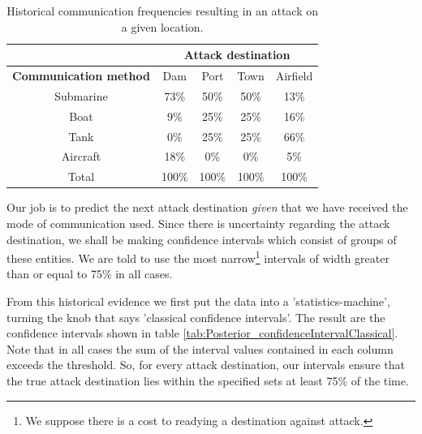 \documentclass[11pt,fullpage]{book}
\begin{document}
\begin{table}[htbp]
  \centering
    \begin{tabular}{ccccc}
    \toprule
          & \multicolumn{4}{c}{\textbf{Attack destination}} \\
    \midrule
    \textbf{Communication method} & Dam & Port & Town & Airfield \\
    Submarine & 73\%  & 50\%  & 50\%  & 13\% \\
    Boat  & 9\%   & 25\%  & 25\%  & 16\% \\
    Tank  & 0\%   & 25\%  & 25\%  & 66\% \\
    Aircraft & 18\%   & 0\%  & 0\%   & 5\% \\
    \bottomrule
    Total & 100\% & 100\% & 100\% & 100\% \\
    \end{tabular}%
  \caption{Historical communication frequencies resulting in an attack on a given location.}\label{tab:Posterior_confidenceIntervalHistoric}
\end{table}%

Our job is to predict the next attack destination \textit{given} that we have received the mode of communication used. Since there is uncertainty regarding the attack destination, we shall be making confidence intervals which consist of groups of these entities. We are told to use the most narrow\footnote{We suppose there is a cost to readying a destination against attack.} intervals of width greater than or equal to 75\% in all cases.

From this historical evidence we first put the data into a 'statistics-machine', turning the knob that says 'classical confidence intervals'. The result are the confidence intervals shown in table \ref{tab:Posterior_confidenceIntervalClassical}. Note that in all cases the sum of the interval values contained in each column exceeds the threshold. So, for every attack destination, our intervals ensure that the true attack destination lies within the specified sets at least 75\% of the time.
\end{document}
